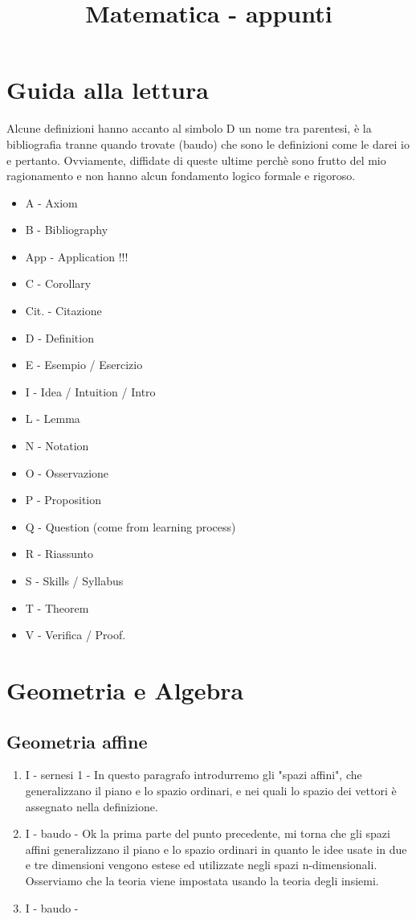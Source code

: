 \documentclass[]{article}
\title{Matematica - appunti}
\author{}
\begin{document}
\maketitle

\section{Guida alla lettura}
Alcune definizioni hanno accanto al simbolo D un nome tra parentesi, \`e la bibliografia tranne quando trovate (baudo) che sono le definizioni come le darei io e pertanto. Ovviamente, diffidate di queste ultime perch\`e sono frutto del mio ragionamento e non hanno alcun fondamento logico formale e rigoroso.
	\begin{itemize}
		\item A - Axiom
		\item B - Bibliography
		\item App - Application !!!
		\item C - Corollary
		\item Cit. - Citazione
		\item D - Definition
		\item E - Esempio / Esercizio
		\item I - Idea / Intuition / Intro
		\item L - Lemma
		\item N - Notation
		\item O - Osservazione
		\item P - Proposition
		\item Q - Question (come from learning process)
		\item R - Riassunto
		\item S - Skills / Syllabus
		\item T - Theorem	
		\item V - Verifica / Proof.
	\end{itemize}

\section{Geometria e Algebra}

\subsection{Geometria affine}
\begin{enumerate}
	\item I - sernesi 1 - In questo paragrafo introdurremo gli "spazi affini", che generalizzano il piano e lo spazio ordinari, e nei quali lo spazio dei vettori \`e assegnato nella definizione.
	\item I - baudo - Ok la prima parte del punto precedente, mi torna che gli spazi affini generalizzano il piano e lo spazio ordinari in quanto le idee usate in due e tre dimensioni vengono estese ed utilizzate negli spazi n-dimensionali. 
	                  Osserviamo che la teoria viene impostata usando la teoria degli insiemi. 
	\item I - baudo - 
\end{enumerate}
\end{document}

